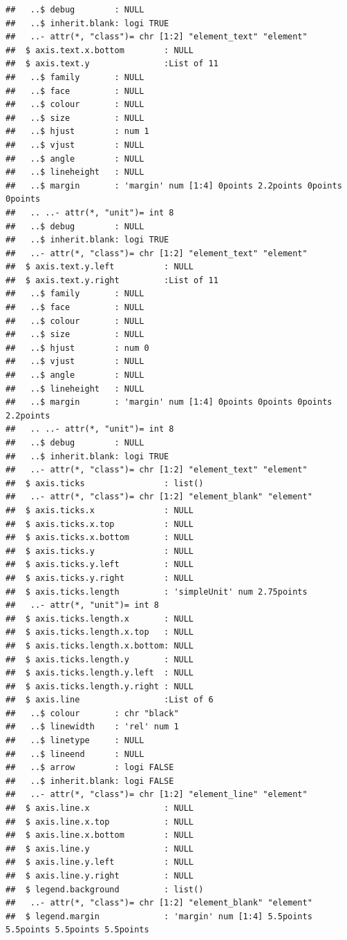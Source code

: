 \documentclass[12pt,preprint, authoryear]{elsarticle}
\numberwithin{equation}{section}
\numberwithin{figure}{section}
\numberwithin{table}{section}
\begin{document}
\begin{verbatim}
##   ..$ debug        : NULL
##   ..$ inherit.blank: logi TRUE
##   ..- attr(*, "class")= chr [1:2] "element_text" "element"
##  $ axis.text.x.bottom        : NULL
##  $ axis.text.y               :List of 11
##   ..$ family       : NULL
##   ..$ face         : NULL
##   ..$ colour       : NULL
##   ..$ size         : NULL
##   ..$ hjust        : num 1
##   ..$ vjust        : NULL
##   ..$ angle        : NULL
##   ..$ lineheight   : NULL
##   ..$ margin       : 'margin' num [1:4] 0points 2.2points 0points 0points
##   .. ..- attr(*, "unit")= int 8
##   ..$ debug        : NULL
##   ..$ inherit.blank: logi TRUE
##   ..- attr(*, "class")= chr [1:2] "element_text" "element"
##  $ axis.text.y.left          : NULL
##  $ axis.text.y.right         :List of 11
##   ..$ family       : NULL
##   ..$ face         : NULL
##   ..$ colour       : NULL
##   ..$ size         : NULL
##   ..$ hjust        : num 0
##   ..$ vjust        : NULL
##   ..$ angle        : NULL
##   ..$ lineheight   : NULL
##   ..$ margin       : 'margin' num [1:4] 0points 0points 0points 2.2points
##   .. ..- attr(*, "unit")= int 8
##   ..$ debug        : NULL
##   ..$ inherit.blank: logi TRUE
##   ..- attr(*, "class")= chr [1:2] "element_text" "element"
##  $ axis.ticks                : list()
##   ..- attr(*, "class")= chr [1:2] "element_blank" "element"
##  $ axis.ticks.x              : NULL
##  $ axis.ticks.x.top          : NULL
##  $ axis.ticks.x.bottom       : NULL
##  $ axis.ticks.y              : NULL
##  $ axis.ticks.y.left         : NULL
##  $ axis.ticks.y.right        : NULL
##  $ axis.ticks.length         : 'simpleUnit' num 2.75points
##   ..- attr(*, "unit")= int 8
##  $ axis.ticks.length.x       : NULL
##  $ axis.ticks.length.x.top   : NULL
##  $ axis.ticks.length.x.bottom: NULL
##  $ axis.ticks.length.y       : NULL
##  $ axis.ticks.length.y.left  : NULL
##  $ axis.ticks.length.y.right : NULL
##  $ axis.line                 :List of 6
##   ..$ colour       : chr "black"
##   ..$ linewidth    : 'rel' num 1
##   ..$ linetype     : NULL
##   ..$ lineend      : NULL
##   ..$ arrow        : logi FALSE
##   ..$ inherit.blank: logi FALSE
##   ..- attr(*, "class")= chr [1:2] "element_line" "element"
##  $ axis.line.x               : NULL
##  $ axis.line.x.top           : NULL
##  $ axis.line.x.bottom        : NULL
##  $ axis.line.y               : NULL
##  $ axis.line.y.left          : NULL
##  $ axis.line.y.right         : NULL
##  $ legend.background         : list()
##   ..- attr(*, "class")= chr [1:2] "element_blank" "element"
##  $ legend.margin             : 'margin' num [1:4] 5.5points 5.5points 5.5points 5.5points

\end{verbatim}
\end{document}
